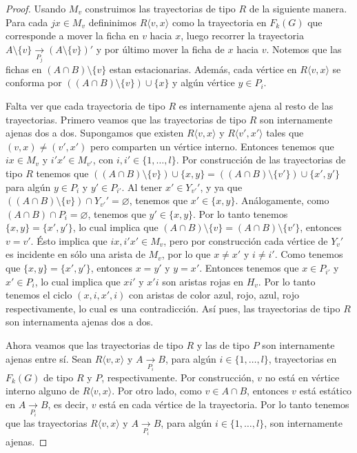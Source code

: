 \begin{proof}
    Usando $M_v$ construimos las trayectorias de tipo $R$ de la siguiente
    manera. Para cada $jx \in M_v$ defininimos $R\langle v, x \rangle$ como la
    trayectoria en $F_k(G)$ que corresponde a mover la ficha en $v$ hacia $x$,
    luego recorrer la trayectoria $A\setminus \{v\} \xrightarrow[P_j]{}
    (A\setminus \{v\})'$ y por \'ultimo mover la ficha de $x$ hacia $v$. Notemos
    que las fichas en $(A\cap B)\setminus \{v\}$ estan estacionarias. Adem\'as,
    cada v\'ertice en $R\langle v,x \rangle$ se conforma por $((A\cap
    B)\setminus \{v\}) \cup \{x\}$ y alg\'un v\'ertice $y \in P_i$.

    Falta ver que cada trayectoria de tipo $R$ es internamente ajena al resto de
    las trayectorias. Primero veamos que las trayectorias de tipo $R$ son
    internamente ajenas dos a dos. Supongamos que existen $R \langle v, x
    \rangle$ y $R\langle v',x' \rangle$ tales que $(v,x) \neq (v',x')$ pero
    comparten un v\'ertice interno. Entonces tenemos que $ix \in M_v$ y $i'x'\in
    M_{v'}$, con $i, i' \in \{1, \dots, l\}$. Por construcci\'on de las
    trayectorias de tipo $R$ tenemos que $((A\cap B)\setminus \{v\}) \cup \{x,
    y\} =((A\cap B)\setminus \{v'\}) \cup \{x', y'\}$ para alg\'un $y \in P_i$ y
    $y' \in P_{i'}$. Al tener $x'\in Y_{v'} '$, y ya que $((A \cap B )\setminus
    \{v\}) \cap Y_{v'}'= \varnothing$, tenemos que $x' \in \{x,y\}$.
    An\'alogamente, como $(A \cap B) \cap P_i = \varnothing$, tenemos que $y'\in
    \{x, y\}$. Por lo tanto tenemos $\{x,y\}= \{x',y'\}$, lo cual implica que
    $(A\cap B)\setminus \{v\} = (A\cap B)\setminus \{v'\}$, entonces $v = v'$.
    \'Esto implica que $ix, i'x' \in M_v$, pero por construcci\'on cada
    v\'ertice de $Y_v '$ es incidente en s\'olo una arista de $M_v$, por lo que
    $x \neq x'$ y $i \neq i'$. Como tenemos que $\{x, y\}=\{x', y'\}$, entonces
    $x=y'$ y $y=x'$. Entonces tenemos que $x \in P_{i'}$ y $x'\in P_i$, lo cual
    implica que $xi'$ y $x'i$ son aristas rojas en $H_v$. Por lo tanto tenemos
    el ciclo $(x, i, x', i)$ con aristas de color azul, rojo, azul, rojo
    respectivamente, lo cual es una contradicci\'on. As\'i pues, las
    trayectorias de tipo $R$ son internamenta ajenas dos a dos.

    Ahora veamos que las trayectorias de tipo $R$ y las de tipo $P$ son
    internamente ajenas entre s\'i{}. Sean $R\langle v,x \rangle$ y $A
    \xrightarrow[P_i]{}  B$, para alg\'un $i \in \{1, \dots, l\}$, trayectorias
    en $F_k(G)$ de tipo $R$ y $P$, respectivamente. Por construcci\'on, $v$ no
    est\'a en v\'ertice interno alguno de $R \langle v,x \rangle$. Por otro
    lado, como $ v \in A\cap B$, entonces $v$ est\'a est\'atico en $A
    \xrightarrow[P_i]{}  B$, es decir, $v$ est\'a en cada v\'ertice de la
    trayectoria. Por lo tanto tenemos que las trayectorias $R\langle v,x
    \rangle$ y $A \xrightarrow[P_i]{}  B$, para alg\'un $i \in \{1, \dots, l\}$,
    son internamente ajenas.


\end{proof}
